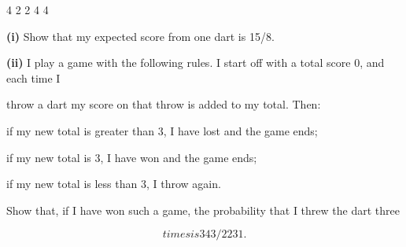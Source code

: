 \documentclass[12pt]{article}
\begin{document}
\begin{flushleft}
4 2 2 4 4\par
\textbf{(i)} Show that my expected score from one dart is 15/8.\par
\textbf{(ii)} I play a game with the following rules. I start off with a total score 0, and each time I\par
throw a dart my score on that throw is added to my total. Then:\par
if my new total is greater than 3, I have lost and the game ends;\par
if my new total is 3, I have won and the game ends;\par
if my new total is less than 3, I throw again.\par
Show that, if I have won such a game, the probability that I threw the dart three\par
\[times is 343/2231.\]
\end{flushleft}
\end{document}
